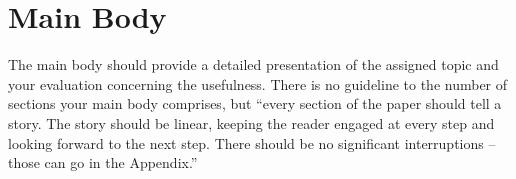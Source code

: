 \section{Main Body} 

The main body should provide a detailed presentation of the assigned topic and your evaluation
concerning the usefulness. There is no guideline to the number of sections your main body comprises,
but \enquote{every section of the paper should tell a story. The story should be linear, keeping
the reader engaged at every step and looking forward to the next step. There should be no
significant interruptions -- those can go in the Appendix.}~\cite{JW06}
